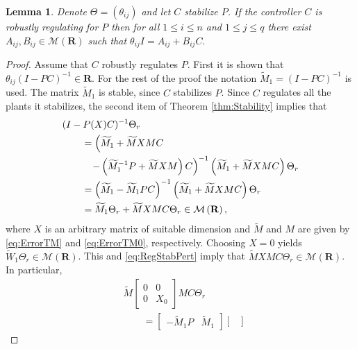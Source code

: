 \documentclass[11pt, a4paper]{amsart}
\newcommand{\inv}{^{-1}}
\newtheorem{lemma}[theorem]{Lemma}
\newcommand{\matrices}[1]{\mathcal{M}\left( #1 \right)}		%
\newcommand{\Plant}{P}										%
\newcommand{\Cont}{C}										%
\newcommand{\Gen}{\Theta}									%
\newcommand{\gen}{\theta}									%
\newcommand{\outd}{n}										%
\newcommand{\stable}{\mathbf{R}}							%
\begin{document}
\begin{lemma}\label{lem:IMP2}
Denote $\Gen=(\gen_{ij})$ and let $\Cont$ stabilize $\Plant$. If the controller $\Cont$ is robustly regulating for $\Plant$ then  for all $1\leq i\leq \outd$ and $1\leq j\leq q$ there exist $A_{ij},B_{ij}\in\matrices{\stable}$ such that 
$ %
\gen_{ij} I=A_{ij}+B_{ij}\Cont.
$
\end{lemma}
\begin{proof}

Assume that $\Cont$ robustly regulates $\Plant$. First it is shown that $\theta_{ij}(I-\Plant\Cont)\inv \in\stable$. For the rest of the proof the notation $\widetilde{M}_1=(I-\Plant\Cont)\inv$ is used. The matrix $\widetilde{M}_1$ is stable, since $\Cont$ stabilizes $\Plant$. Since $\Cont$ regulates all the plants it stabilizes, the second item of Theorem \ref{thm:Stability} implies that
\begin{align}
& (I-\Plant(X)\Cont)\inv \Gen_r\notag\\
& \qquad =\left(\widetilde{M}_1 +\widetilde{M}X M\Cont\right.\notag\\
& \qquad\;\;\; \left.-\left(\widetilde{M}_1\inv \Plant+\widetilde{M}X M\right)\Cont\right)\inv\left(\widetilde{M}_1 +\widetilde{M}X M\Cont\right)\Gen_r\notag\\
& \qquad= \left(\widetilde{M}_1 -\widetilde{M}_1 \Plant\Cont\right)\inv \left(\widetilde{M}_1 +\widetilde{M}X M\Cont\right)\Gen_r\notag
\\
& \qquad= \widetilde{M}_1\Gen_r +\widetilde{M}X M\Cont\Gen_r\in\matrices{\stable},\label{eq:RegStabPert}
\end{align}
where $X$ is an arbitrary matrix of suitable dimension and $\widetilde{M}$ and $M$ are given by \eqref{eq:ErrorTM} and \eqref{eq:ErrorTM0}, respectively. Choosing $X=0$ yields $\widetilde{W}_1\Gen_r\in\matrices{\stable}$. This and \eqref{eq:RegStabPert} imply that $\widetilde{M}X M\Cont\Gen_r\in\matrices{\stable}$. In particular,
\begin{align*}
& \widetilde{M}\begin{bmatrix}
0 & 0\\
0 & X_0
\end{bmatrix} M\Cont\Gen_r\\
&\qquad  = 
\begin{bmatrix}
-\widetilde{M}_1\Plant & \widetilde{M}_1
\end{bmatrix}
\begin{bmatrix}

\end{bmatrix}
\end{align*}
\end{proof}
\end{document}
